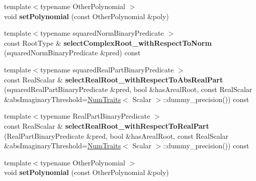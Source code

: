 \begin{DoxyCompactItemize}
\item 
\mbox{\label{class_eigen_1_1_polynomial_solver_base_a196f545c5b78895bc1d67b56b03c33cd}} 
{\footnotesize template$<$typename Other\+Polynomial $>$ }\\void {\bfseries set\+Polynomial} (const Other\+Polynomial \&poly)
\item 
\mbox{\label{class_eigen_1_1_polynomial_solver_base_a0f84c55daac618ccef0f19e01ba0863f}} 
{\footnotesize template$<$typename squared\+Norm\+Binary\+Predicate $>$ }\\const Root\+Type \& {\bfseries select\+Complex\+Root\+\_\+with\+Respect\+To\+Norm} (squared\+Norm\+Binary\+Predicate \&pred) const
\item 
\mbox{\label{class_eigen_1_1_polynomial_solver_base_afd4ddab1be4bdb2b1055194b86de1885}} 
{\footnotesize template$<$typename squared\+Real\+Part\+Binary\+Predicate $>$ }\\const Real\+Scalar \& {\bfseries select\+Real\+Root\+\_\+with\+Respect\+To\+Abs\+Real\+Part} (squared\+Real\+Part\+Binary\+Predicate \&pred, bool \&has\+Areal\+Root, const Real\+Scalar \&abs\+Imaginary\+Threshold=\hyperlink{group___core___module_struct_eigen_1_1_num_traits}{Num\+Traits}$<$ Scalar $>$\+::dummy\+\_\+precision()) const
\item 
\mbox{\label{class_eigen_1_1_polynomial_solver_base_ae5275e8911cb0f27d8a9b6648221c320}} 
{\footnotesize template$<$typename Real\+Part\+Binary\+Predicate $>$ }\\const Real\+Scalar \& {\bfseries select\+Real\+Root\+\_\+with\+Respect\+To\+Real\+Part} (Real\+Part\+Binary\+Predicate \&pred, bool \&has\+Areal\+Root, const Real\+Scalar \&abs\+Imaginary\+Threshold=\hyperlink{group___core___module_struct_eigen_1_1_num_traits}{Num\+Traits}$<$ Scalar $>$\+::dummy\+\_\+precision()) const
\item 
\mbox{\label{class_eigen_1_1_polynomial_solver_base_a196f545c5b78895bc1d67b56b03c33cd}} 
{\footnotesize template$<$typename Other\+Polynomial $>$ }\\void {\bfseries set\+Polynomial} (const Other\+Polynomial \&poly)

\end{DoxyCompactItemize}

